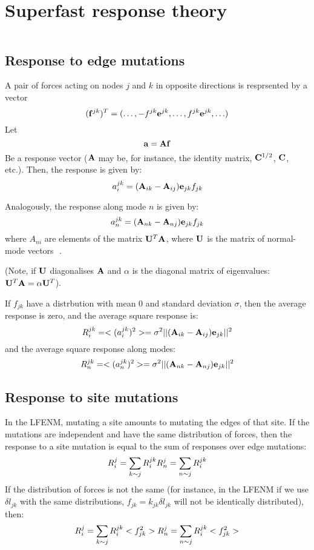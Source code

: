 \documentclass[
]{article}
\author{}
\date{\vspace{-2.5em}}
\begin{document}
\hypertarget{superfast-response-theory}{%
\section{Superfast response theory}\label{superfast-response-theory}}

\[
\newcommand{\fvec}{\mathbf{f}}
\newcommand{\evec}{\mathbf{e}}
\newcommand{\avec}{\mathbf{a}}
\newcommand{\amat}{\mathbf{A}}
\newcommand{\umat}{\mathbf{U}}
\newcommand{\kmat}{\mathbf{K}}
\newcommand{\cmat}{\mathbf{C}}
\]

\hypertarget{response-to-edge-mutations}{%
\subsection{Response to edge
mutations}\label{response-to-edge-mutations}}

A pair of forces acting on nodes \(j\) and \(k\) in opposite directions
is resprsented by a vector \[
(\fvec^{jk})^T = (\ldots, -f^{jk}\evec^{jk},\ldots,f^{jk}\evec^{jk},\ldots)
\] Let \[
\avec = \amat \fvec
\] Be a response vector (\(\amat\) may be, for instance, the identity
matrix, \(\cmat^{1/2}\), \(\cmat\), etc.). Then, the response is given
by: \[
a_i^{jk} = (\amat_{ik} - \amat_{ij})\evec_{jk}f_{jk}
\]

Analogously, the response along mode \(n\) is given by: \[
a_n^{jk} = (\amat_{nk} - \amat_{nj})\evec_{jk}f_{jk}
\] where \(A_{ni}\) are elements of the matrix \(\umat^T \amat\), where
\(\umat\) is the matrix of normal-mode vectors \(<i|n>\) .

(Note, if \(\umat\) diagonalises \(\amat\) and \(\alpha\) is the
diagonal matrix of eigenvalues: \(\umat^T\amat = \alpha \umat^T\)).

If \(f_{jk}\) have a distrbution with mean \(0\) and standard deviation
\(\sigma\), then the average response is zero, and the average square
response is: \[
R_i^{jk} = <(a_i^{jk})^2> = \sigma^2 ||(\amat_{ik} - \amat_{ij})\evec_{jk}||^2
\] and the average square response along modes: \[
R_n^{jk} = <(a_n^{jk})^2> = \sigma^2 ||(\amat_{nk} - \amat_{nj})\evec_{jk}||^2
\]

\hypertarget{response-to-site-mutations}{%
\subsection{Response to site
mutations}\label{response-to-site-mutations}}

In the LFENM, mutating a site amounts to mutating the edges of that
site. If the mutations are independent and have the same distribution of
forces, then the response to a site mutation is equal to the sum of
responses over edge mutations: \[
R_i^{j} = \sum_{k \sim j} R_i^{jk} \\
R_n^{j} = \sum_{n \sim j} R_i^{jk}
\] If the distribution of forces is not the same (for instance, in the
LFENM if we use \(\delta l_{jk}\) with the same distributions,
\(f_{jk} = k_{jk}\delta l_{jk}\) will not be identically distributed),
then: \[
R_i^{j} = \sum_{k \sim j} R_i^{jk}<f_{jk}^2> \\
R_n^{j} = \sum_{n \sim j} R_i^{jk}<f_{jk}^2>
\]
\end{document}
